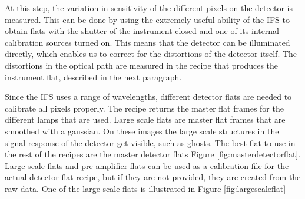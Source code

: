 \documentclass[twoside,single,12pt]{lion-msc}
\begin{document}
At this step, the variation in sensitivity of the different pixels on the detector is measured. This can be done by using the extremely useful ability of the IFS to obtain flats with the shutter of the instrument closed and one of its internal calibration sources turned on. This means that the detector can be illuminated directly, which enables us to correct for the distortions of the detector itself. The distortions in the optical path are measured in the recipe that produces the instrument flat, described in the next paragraph. 
\bigskip

Since the IFS uses a range of wavelengths, different detector flats are needed to calibrate all pixels properly. The recipe returns the master flat frames for the different lamps that are used. Large scale flats are master flat frames that are smoothed with a gaussian. On these images the large scale structures in the signal response of the detector get visible, such as ghosts. The best flat to use in the rest of the recipes are the master detector flats Figure \ref{fig:masterdetectorflat}. Large scale flats and pre-amplifier flats can be used as a calibration file for the actual detector flat recipe, but if they are not provided, they are created from the raw data. One of the large scale flats is illustrated in Figure \ref{fig:largescaleflat}
\end{document}
